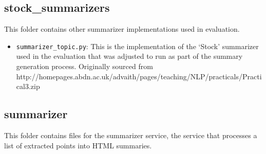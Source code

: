 \subsection*{stock\_summarizers}
  This folder contains other summarizer implementations used in evaluation.
  \begin{itemize}
    \item
      \texttt{summarizer\_topic.py}: This is the implementation of the `Stock' summarizer used in the evaluation that was adjusted to run as part of the summary generation process. Originally sourced from \\ http://homepages.abdn.ac.uk/advaith/pages/teaching/NLP/practicals/Practical3.zip
  \end{itemize}

\subsection*{summarizer}
  This folder contains files for the summarizer service, the service that processes a list of extracted points into HTML summaries.

